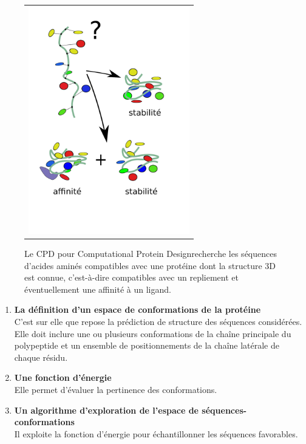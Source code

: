    \begin{figure}[!htbp]
     \centering
     \begin{tabular}{c}
       \includegraphics[width=7cm]{figure/CPD.pdf} &
     \end{tabular}
     
     \caption{Le CPD pour \og Computational Protein Design\fg recherche les séquences d'acides aminés compatibles avec une protéine dont la structure 3D  est connue, c'est-à-dire compatibles avec un repliement et éventuellement une affinité à un ligand.}
\label{graph:CPD}
   \end{figure}


\begin{enumerate}[leftmargin=*]

\item \textbf{La définition d'un espace de conformations de la protéine}\\
C'est sur elle que repose la prédiction de structure des séquences considérées. Elle doit inclure une ou plusieurs conformations de la chaîne principale du polypeptide et un ensemble de positionnements de la chaîne latérale de chaque résidu.
\item \textbf{Une fonction d'énergie}\\
Elle permet d'évaluer la pertinence des conformations. 
\item \textbf{Un algorithme d'exploration de l'espace de séquences-conformations}\\
Il exploite la fonction d'énergie pour échantillonner les séquences favorables.
\end{enumerate}


